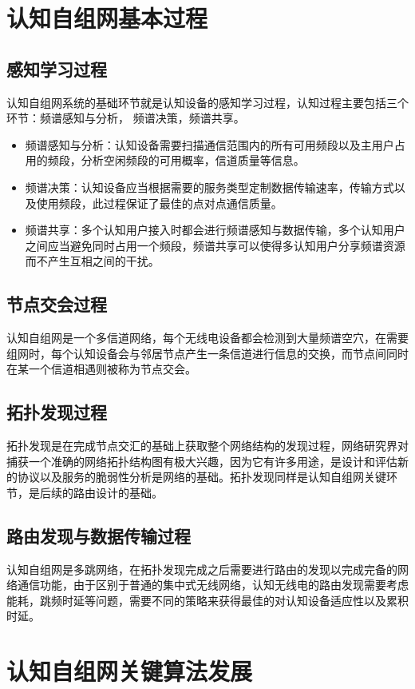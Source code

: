 \documentclass[a4paper,AutoFakeBold,oneside,12pt]{book}
\begin{document}
\section{认知自组网基本过程}
\subsection{感知学习过程}
  认知自组网系统的基础环节就是认知设备的感知学习过程，认知过程主要包括三个环节：频谱感知与分析， 频谱决策，频谱共享。
\begin{itemize}%
  \item 频谱感知与分析：认知设备需要扫描通信范围内的所有可用频段以及主用户占用的频段，分析空闲频段的可用概率，信道质量等信息。

  \item 频谱决策：认知设备应当根据需要的服务类型定制数据传输速率，传输方式以及使用频段，此过程保证了最佳的点对点通信质量。

  \item 频谱共享：多个认知用户接入时都会进行频谱感知与数据传输，多个认知用户之间应当避免同时占用一个频段，频谱共享可以使得多认知用户分享频谱资源而不产生互相之间的干扰。
 \end{itemize}
\subsection{节点交会过程}
  认知自组网是一个多信道网络，每个无线电设备都会检测到大量频谱空穴，在需要组网时，每个认知设备会与邻居节点产生一条信道进行信息的交换，而节点间同时在某一个信道相遇则被称为节点交会。
\subsection{拓扑发现过程}
  拓扑发现是在完成节点交汇的基础上获取整个网络结构的发现过程，网络研究界对捕获一个准确的网络拓扑结构图有极大兴趣，因为它有许多用途，是设计和评估新的协议以及服务的脆弱性分析是网络的基础。拓扑发现同样是认知自组网关键环节，是后续的路由设计的基础。
\subsection{路由发现与数据传输过程}
  认知自组网是多跳网络，在拓扑发现完成之后需要进行路由的发现以完成完备的网络通信功能，由于区别于普通的集中式无线网络，认知无线电的路由发现需要考虑能耗，跳频时延等问题，需要不同的策略来获得最佳的对认知设备适应性以及累积时延。
\section{认知自组网关键算法发展}
  
\end{document}
